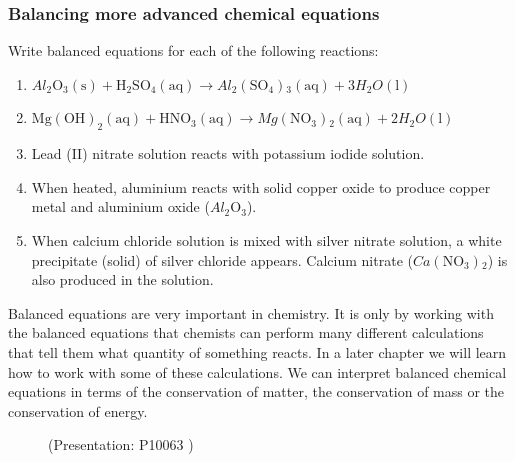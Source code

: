             \subsubsection{  Balancing more advanced chemical equations
      }
            \nopagebreak
      \label{m38727*id66790}Write balanced equations for each of the following reactions:\par 
      \label{m38727*id66796}\begin{enumerate}[noitemsep, label=\textbf{\arabic*}. ] 
            \label{m38727*uid31}\item 
${Al}_{2}{\mathrm{O}}_{3}\left(\mathrm{s}\right)+{\mathrm{H}}_{2}{\mathrm{SO}}_{4}\left(\mathrm{aq}\right)\to {Al}_{2}\left({\mathrm{SO}}_{4}\right){}_{3}\left(\mathrm{aq}\right)+3{{H}}_{2}{O}\left(\mathrm{l}\right)$
        \label{m38727*uid32}\item 
        ${\mathrm{Mg\left(OH\right)}}_{2}\left(\mathrm{aq}\right)+{\mathrm{HNO}}_{3}\left(\mathrm{aq}\right)\to Mg\left({\mathrm{NO}}_{3}\right){}_{2}\left(\mathrm{aq}\right)+2{{H}}_{2}{O}\left(\mathrm{l}\right)$
        \label{m38727*uid33}\item Lead (II) nitrate solution reacts with potassium iodide solution.
\label{m38727*uid34}\item When heated, aluminium reacts with solid copper oxide to produce copper metal and aluminium oxide (${Al}_{2}{\mathrm{O}}_{3}$).
\label{m38727*uid35}\item When calcium chloride solution is mixed with silver nitrate solution, a white precipitate (solid) of silver chloride appears. Calcium nitrate ($Ca\left({\mathrm{NO}}_{3}\right){}_{2}$) is also produced in the solution.
        \end{enumerate}
    \label{m38727*eip-429}Balanced equations are very important in chemistry. It is only by working with the balanced equations that chemists can perform many different calculations that tell them what quantity of something reacts. In a later chapter we will learn how to work with some of these calculations. We can interpret balanced chemical equations in terms of the conservation of matter, the conservation of mass or the conservation of energy. \label{m38727*eip-366}
    \setcounter{subfigure}{0}
	\begin{figure}[H] %
    \label{m38727*slidesharemedia}\label{m38727*slideshareflash} { (Presentation:  P10063 )}
      \vspace{2pt}
    \vspace{.1in}
 \end{figure}       \par \label{m38727*cid6}
